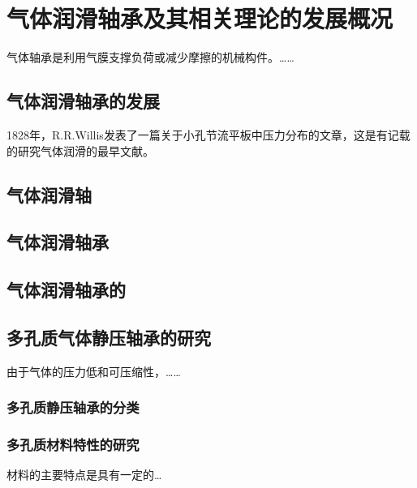 \section{气体润滑轴承及其相关理论的发展概况}
气体轴承是利用气膜支撑负荷或减少摩擦的机械构件。……



\subsection{气体润滑轴承的发展}
1828年，R.R.Willis\cite{arm}发表了一篇关于小孔节流平板中压力分布的文章，这是有记载的研究气体润滑的最早文献。

\subsection{气体润滑轴}

\subsection{气体润滑轴承}

\subsection{气体润滑轴承的}

\subsection{多孔质气体静压轴承的研究}
由于气体的压力低和可压缩性，……
\subsubsection{多孔质静压轴承的分类}
\subsubsection{多孔质材料特性的研究}
材料的主要特点是具有一定的…


